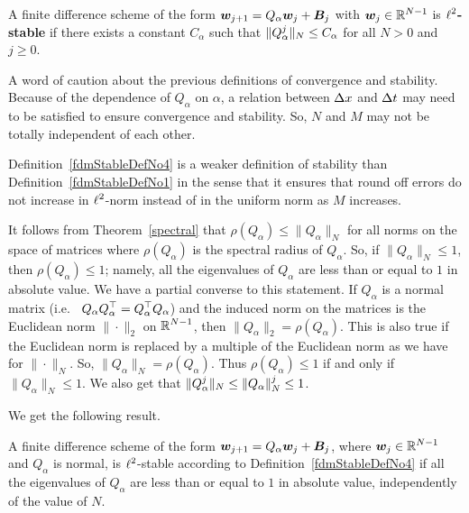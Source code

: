\begin{defn} \label{fdmStableDefNo4}
A finite difference scheme of the form
$\bm{w}_{j+1} = Q_\alpha\bm{w}_j + \bm{B}_j$
with $\displaystyle \bm{w}_j \in \mathbb{R}^{N-1}$ is
{\bfseries $\displaystyle \ell^2$-stable}
 if there
exists a constant $C_\alpha$ such that
$\displaystyle \|Q_\alpha^j\|_N \leq C_\alpha$
for all $N>0$ and $j\geq 0$.
\end{defn}

A word of caution about the previous definitions of convergence and
stability.  Because of the dependence of $Q_\alpha$ on $\alpha$, a
relation between $\Delta{x}$ and $\Delta{t}$ may need to be satisfied to
ensure convergence and stability.  So, $N$ and 
$M$ may not be totally independent of each other.

Definition~\ref{fdmStableDefNo4} is a weaker
definition of stability than Definition~\ref{fdmStableDefNo1} in the
sense that it ensures that round off errors do not increase in
$\displaystyle \ell^2$-norm instead of in the uniform norm as $M$ increases.

It follows from Theorem~\ref{spectral} that
$\rho(Q_\alpha) \leq \|Q_\alpha\|_N$
for all norms on the space of  matrices where
$\rho(Q_\alpha)$ is the spectral radius of $Q_\alpha$.  So, if
$\|Q_\alpha\|_N\leq 1$, then $\rho(Q_\alpha)\leq 1$; namely, all the
eigenvalues of $Q_\alpha$ are less than or equal to $1$ in absolute
value.   We have a partial converse to this statement.  If $Q_\alpha$
is a normal matrix (i.e.
\ $\displaystyle Q_\alpha Q_\alpha^\top = Q_\alpha^\top Q_\alpha$)
and the induced norm on the  matrices is
the Euclidean norm $\|\cdot\|_2$ on $\displaystyle \mathbb{R}^{N-1}$, then
$\|Q_\alpha\|_2 = \rho(Q_\alpha)$.
This is also true if the Euclidean norm is replaced by a multiple of
the Euclidean norm as we have for $\|\cdot\|_N$.  So,
$\|Q_\alpha\|_N = \rho(Q_\alpha)$.
Thus $\rho(Q_\alpha) \leq 1$ if and only if $\|Q_\alpha\|_N \leq 1$.  We also get
that $\displaystyle \|Q_\alpha^j\|_N \leq \|Q_\alpha\|_N^j \leq 1$.

We get the following result.

\begin{prop}\label{MatrixStabProp}
A finite difference scheme of the form
$\bm{w}_{j+1} = Q_\alpha\bm{w}_j + \bm{B}_j$,
where $\displaystyle \bm{w}_j \in \mathbb{R}^{N-1}$ and $Q_\alpha$ is normal, is
$\displaystyle \ell^2$-stable according to Definition~\ref{fdmStableDefNo4}
if all the eigenvalues of $Q_\alpha$ are less than or equal to $1$ in
absolute value, independently of the value of $N$.
\end{prop}

